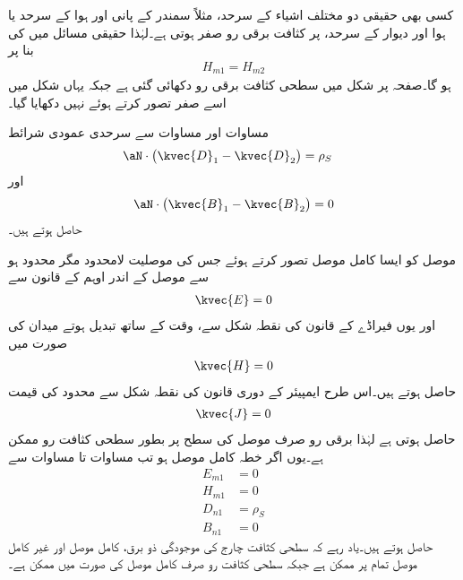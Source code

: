 کسی بھی حقیقی دو مختلف اشیاء کے سرحد، مثلاً سمندر کے پانی اور ہوا کے سرحد یا ہوا اور دیوار کے سرحد، پر کثافت برقی رو  صفر ہوتی ہے۔لہٰذا حقیقی مسائل میں  کی بنا پر
\begin{align}\label{مساوات_میکس_ویل_سرحدی_شرائط_بدلتے_میدان_ب}
H_{m1}=H_{m2}
\end{align}
ہو گا۔صفحہ  پر شکل  میں سطحی کثافت برقی رو  دکھائی گئی ہے جبکہ یہاں شکل  میں اسے صفر تصور کرتے ہوئے نہیں دکھایا گیا۔

مساوات  اور مساوات  سے سرحدی عمودی شرائط
\begin{align}\label{مساوات_میکس_ویل_سرحدی_شرائط_بدلتے_میدان_پ}
\aN \cdot \left(\kvec{D}_1-\kvec{D}_2 \right)&=\rho_S
\end{align}
اور
\begin{align}\label{مساوات_میکس_ویل_سرحدی_شرائط_بدلتے_میدان_ت}
\aN \cdot \left(\kvec{B}_1-\kvec{B}_2 \right)=0
\end{align}
حاصل ہوتے ہیں۔

موصل کو ایسا کامل موصل تصور کرتے ہوئے جس کی موصلیت لامحدود مگر  محدود ہو سے موصل کے اندر اوہم کے قانون سے
\begin{align}
\kvec{E}=0
\end{align}
اور یوں فیراڈے کے قانون کی نقطہ شکل سے، وقت کے ساتھ تبدیل ہوتے میدان کی صورت میں
\begin{align}
\kvec{H}=0
\end{align}
حاصل ہوتے ہیں۔اس طرح ایمپیئر کے دوری قانون کی نقطہ شکل سے محدود  کی قیمت
\begin{align}
\kvec{J}=0
\end{align}
حاصل ہوتی ہے لہٰذا برقی رو صرف موصل کی سطح پر بطور سطحی کثافت رو  ممکن ہے۔یوں اگر خطہ  کامل موصل ہو تب مساوات  تا مساوات  سے
\begin{align}
E_{m1}&=0   \label{مساوات_میکس_ویل_کامل_موصل_سرحدی_شرط_الف}\\
H_{m1}&=0   \label{مساوات_میکس_ویل_کامل_موصل_سرحدی_شرط_ب}\\
D_{n1}&=\rho_S    \label{مساوات_میکس_ویل_کامل_موصل_سرحدی_شرط_پ}\\
B_{n1}&=0    \label{مساوات_میکس_ویل_کامل_موصل_سرحدی_شرط_ت}
\end{align}
حاصل ہوتے ہیں۔یاد رہے کہ سطحی کثافت چارج کی موجودگی ذو برق، کامل موصل اور غیر کامل موصل تمام پر ممکن ہے جبکہ سطحی کثافت رو  صرف کامل موصل کی صورت میں ممکن ہے۔

